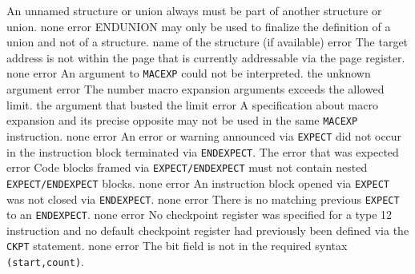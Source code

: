 \documentclass[12pt,twoside]{report}
\newcommand{\tty}[1]{{\tt #1}}
\begin{document}
\begin{description}
               {An unnamed structure or union always must be part
                of another structure or union.}
               {none}
               {error}
               {ENDUNION may only be used to finalize the definition
                of a union and not of a structure.}
               {name of the structure (if available)}
               {error}
               {The target address is not within the page
                that is currently addressable via the page
                register.}
               {none}
               {error}
               {An argument to \tty{MACEXP} could not be
                interpreted.}
               {the unknown argument}
               {error}
               {The number macro expansion arguments exceeds the allowed limit.}
               {the argument that busted the limit}
               {error}
               {A specification about macro expansion and its
                precise opposite may not be used in the same
                \tty{MACEXP} instruction.}
               {none}
               {error}
               {An error or warning announced via {\tt EXPECT} did not occur in the
                instruction block terminated via {\tt ENDEXPECT}.}
               {The error that was expected}
               {error}
               {Code blocks framed via {\tt EXPECT/ENDEXPECT} must not contain
                nested {\tt EXPECT/ENDEXPECT} blocks.}
               {none}
               {error}
               {An instruction block opened via {\tt EXPECT} was not closed via
                {\tt ENDEXPECT}.}
               {none}
               {error}
               {There is no matching previous {\tt EXPECT} to an {\tt ENDEXPECT}.}
               {none}
               {error}
               {No checkpoint register was specified for a type 12 instruction
                and no default checkpoint register had previously been defined
                via the {\tt CKPT} statement.}
               {none}
               {error}
               {The bit field is not in the required syntax {\tt (start,count)}.}

\end{description}
\end{document}

